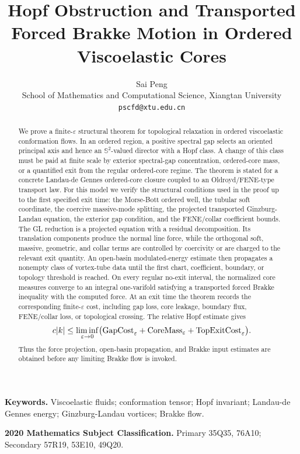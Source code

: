 \documentclass[11pt]{article}
\title{Hopf Obstruction and Transported Forced Brakke Motion in Ordered Viscoelastic Cores}
\author{Sai Peng\\
School of Mathematics and Computational Science, Xiangtan University\\
\texttt{pscfd@xtu.edu.cn}}
\date{}
\theoremstyle{definition}
\newcommand{\Sph}{\mathbb S}
\newcommand{\eps}{\varepsilon}
\begin{document}
\maketitle


\begin{abstract}
We prove a finite-\(\eps\) structural theorem for topological relaxation in
ordered viscoelastic conformation flows.  In an ordered region, a positive
spectral gap selects an oriented principal axis and hence an \(\Sph^2\)-valued
director with a Hopf class.  A change of this class must be paid at finite
scale by exterior spectral-gap concentration, ordered-core mass, or a
quantified exit from the regular ordered-core regime.  The theorem is stated
for a concrete Landau-de Gennes ordered-core closure coupled to an
Oldroyd/FENE-type transport law.  For this model we verify the structural
conditions used in the proof up to the first specified exit time: the
Morse-Bott ordered well, the tubular soft coordinate, the coercive massive-mode
splitting, the projected transported Ginzburg-Landau equation, the exterior gap
condition, and the FENE/collar coefficient bounds.  The GL reduction is a
projected equation with a residual decomposition.  Its translation components
produce the normal line force, while the orthogonal soft, massive, geometric,
and collar terms are controlled by coercivity or are charged to the relevant
exit quantity.  An open-basin modulated-energy estimate then propagates a
nonempty class of vortex-tube data until the first chart, coefficient,
boundary, or topology threshold is reached.  On every regular no-exit interval,
the normalized core measures converge to an integral one-varifold satisfying a
transported forced Brakke inequality with the computed force.  At an exit time
the theorem records the corresponding finite-\(\eps\) cost, including gap
loss, core leakage, boundary flux, FENE/collar loss, or topological crossing.
The relative Hopf estimate gives
\[
        c|k|
        \le
        \liminf_{\eps\to0}
        \bigl({\rm GapCost}_\eps
        +{\rm CoreMass}_\eps
        +{\rm TopExitCost}_\eps\bigr).
\]
Thus the force projection, open-basin propagation, and Brakke input estimates
are obtained before any limiting Brakke flow is invoked.
\end{abstract}

\noindent\textbf{Keywords.}
Viscoelastic fluids; conformation tensor; Hopf invariant; Landau-de Gennes
energy; Ginzburg-Landau vortices; Brakke flow.

\medskip
\noindent\textbf{2020 Mathematics Subject Classification.}
Primary 35Q35, 76A10; Secondary 57R19, 53E10, 49Q20.
\end{document}
